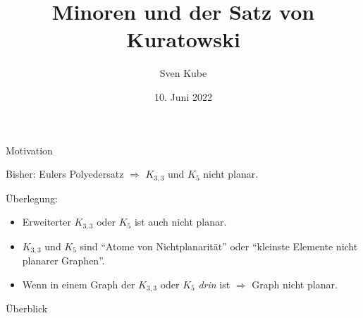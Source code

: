 \documentclass[aspectratio=169]{beamer}
\title{Minoren und der Satz von Kuratowski}
\author{Sven Kube}
\date{10. Juni 2022}
\begin{document}




\begin{frame}
\titlepage
{}
\end{frame}

\begin{frame}[t]{Motivation} \vspace{4pt}

Bisher: Eulers Polyedersatz $\Rightarrow$ $K_{3,3}$ und $K_5$ nicht planar.

\vspace{1em}

Überlegung: 

\begin{itemize}
    \item Erweiterter $K_{3,3}$ oder $K_5$ ist auch nicht planar.
    \item $K_{3,3}$ und $K_5$ sind \enquote{Atome von Nichtplanarität} oder \enquote{kleinste Elemente nicht planarer Graphen}.
    \item Wenn in einem Graph der $K_{3,3}$ oder $K_5$ \textit{drin} ist $\Rightarrow$ Graph nicht planar.
\end{itemize}

\end{frame}

\begin{frame}[c]{Überblick}\vspace{0.6em}
\small{
\tableofcontents
}
\end{frame}
\end{document}
